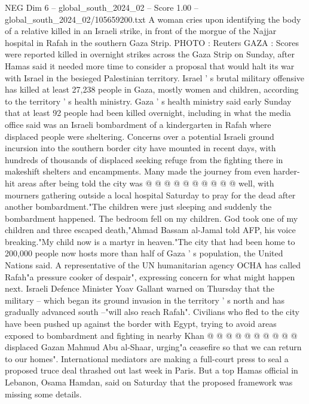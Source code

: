 \begin{textsample}{NEG Dim 6 – global\_south\_2024\_02 – Score 1.00 – global\_south\_2024\_02/105659200.txt}  \label{ex:f6_neg_271}
A woman cries upon identifying the body of a relative killed in an Israeli strike, in front of the morgue of the Najjar hospital in Rafah in the southern Gaza Strip.
PHOTO : Reuters GAZA : Scores were reported killed in overnight strikes across the Gaza Strip on Sunday, after Hamas said it needed more time to consider a proposal that would halt its war with Israel in the besieged Palestinian territory.
Israel ' s brutal military offensive has killed at least 27,238 people in Gaza, mostly women and children, according to the territory ' s health ministry.
Gaza ' s health ministry said early Sunday that at least 92 people had been killed overnight, including in what the media office said was an Israeli bombardment of a kindergarten in Rafah where displaced people were sheltering.
Concerns over a potential Israeli ground incursion into the southern border city have mounted in recent days, with hundreds of thousands of displaced seeking refuge from the fighting there in makeshift shelters and encampments.
Many made the journey from even harder-hit areas after being told the city was @ @ @ @ @ @ @ @ @ @ well, with mourners gathering outside a local hospital Saturday to pray for the dead after another bombardment."The children were just sleeping and suddenly the bombardment happened.
The bedroom fell on my children.
God took one of my children and three escaped death,"Ahmad Bassam al-Jamal told AFP, his voice breaking."My child now is a martyr in heaven."The city that had been home to 200,000 people now hosts more than half of Gaza ' s population, the United Nations said.
A representative of the UN humanitarian agency OCHA has called Rafah"a pressure cooker of despair", expressing concern for what might happen next.
Israeli Defence Minister Yoav Gallant warned on Thursday that the military -- which began its ground invasion in the territory ' s north and has gradually advanced south --"will also reach Rafah".
Civilians who fled to the city have been pushed up against the border with Egypt, trying to avoid areas exposed to bombardment and fighting in nearby Khan @ @ @ @ @ @ @ @ @ @ displaced Gazan Mahmud Abu al-Shaar, urging"a ceasefire so that we can return to our homes".
International mediators are making a full-court press to seal a proposed truce deal thrashed out last week in Paris.
But a top Hamas official in Lebanon, Osama Hamdan, said on Saturday that the proposed framework was missing some details.

\end{textsample}
